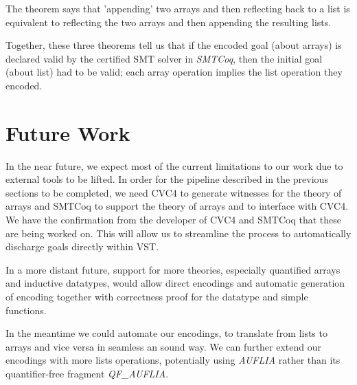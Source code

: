 \documentclass[onecolumn, preprint]{sigplanconf}
\begin{document}
The theorem says that 'appending' two arrays and then reflecting back to a list is equivalent to reflecting the two arrays and then appending the resulting lists.

Together, these three theorems tell us that if the encoded goal (about arrays) is declared valid by the certified SMT solver in \emph{SMTCoq}, then the initial goal (about list) had to be valid; each array operation implies the list operation they encoded.

\section{Future Work}
\label{sec:future}
In the near future, we expect most of the current limitations to our work due to external tools to be lifted. In order for the pipeline described in the previous sections to be completed, we need CVC4 to generate witnesses for the theory of arrays and SMTCoq to support the theory of arrays and to interface with CVC4. We have the confirmation from the developer of CVC4 and SMTCoq that these are being worked on. This will allow us to streamline the process to automatically discharge goals directly within VST. 

In a more distant future, support for more theories, especially quantified arrays and inductive datatypes, would allow direct encodings and automatic generation of encoding together with correctness proof for the datatype and simple functions.

In the meantime we could automate our encodings, to translate from lists to arrays and vice versa in seamless an sound way. We can further extend our encodings with more lists operations, potentially using \emph{AUFLIA} rather than its quantifier-free fragment \emph{QF\_AUFLIA}.
\end{document}
